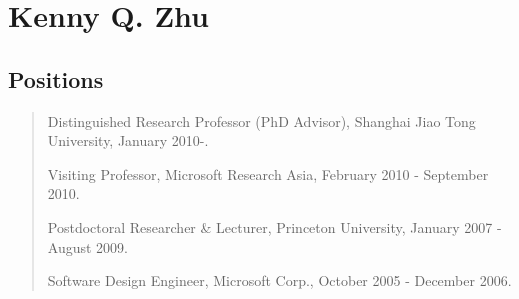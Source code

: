 \documentclass[10pt,a4paper]{article}
\newcommand{\sk}{\vspace{1mm}}
\begin{document}
\section*{Kenny Q. Zhu}


\subsection*{Positions}
\begin{quote}
Distinguished Research Professor (PhD Advisor), 
Shanghai Jiao Tong University, January 2010-. 

%
Visiting Professor, Microsoft Research Asia, February 2010 - September 2010.

Postdoctoral Researcher \& Lecturer, Princeton University, January 2007 - August 2009.

Software Design Engineer, Microsoft Corp., October 2005 - December 2006.
\end{quote}
\end{document}
